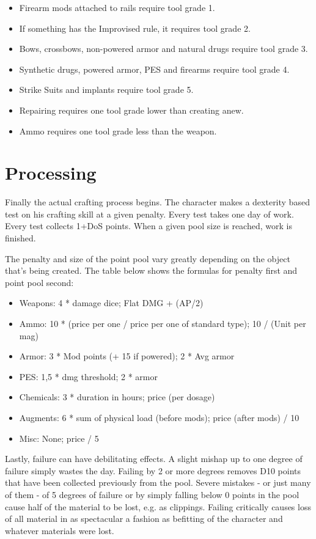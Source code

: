 \documentclass[12pt,a4paper,openany]{book}
\begin{document}
	\begin{itemize}
		\item Firearm mods attached to rails require tool grade 1.
		\item If something has the Improvised rule, it requires tool grade 2.
		\item Bows, crossbows, non-powered armor and natural drugs require tool grade 3.
		\item Synthetic drugs, powered armor, PES and firearms require tool grade 4.
		\item Strike Suits and implants require tool grade 5.
		\item Repairing requires one tool grade lower than creating anew.
		\item Ammo requires one tool grade less than the weapon.
	\end{itemize}

	\chapter{Processing}
	Finally the actual crafting process begins. The character makes a dexterity based test on his crafting skill at a given penalty. Every test takes one day of work. Every test collects 1+DoS points. When a given pool size is reached, work is finished.\par
	The penalty and size of the point pool vary greatly depending on the object that’s being created. The table below shows the formulas for penalty first and point pool second:
	\begin{itemize}
		\item Weapons: 4 * damage dice; Flat DMG + (AP/2)
		\item Ammo: 10 * (price per one / price per one of standard type); 10 / (Unit per mag)
		\item Armor: 3 * Mod points (+ 15 if powered); 2 * Avg armor
		\item PES: 1,5 * dmg threshold; 2 * armor
		\item Chemicals: 3 * duration in hours; price (per dosage)
		\item Augments: 6 * sum of physical load (before mods); price (after mods) / 10
		\item Misc: None; price / 5
	\end{itemize}
	Lastly, failure can have debilitating effects. A slight mishap up to one degree of failure simply wastes the day. Failing by 2 or more degrees removes D10 points that have been collected previously from the pool. Severe mistakes - or just many of them - of 5 degrees of failure or by simply falling below 0 points in the pool cause half of the material to be lost, e.g. as clippings. Failing critically causes loss of all material in as spectacular a fashion as befitting of the character and whatever materials were lost.
\end{document}
